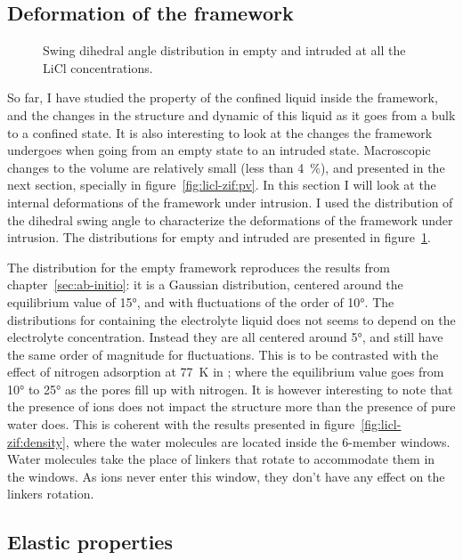 \documentclass[thesis]{subfiles}
\begin{document}
\subsection{Deformation of the framework}
\label{sec:licl-zifdeformation}

\begin{figure}[ht]
    \centering
    
    \caption{Swing dihedral angle distribution in empty and intruded  at
    all the LiCl concentrations.}
    \label{fig:licl-zif:dihedrals}
\end{figure}

So far, I have studied the property of the confined liquid inside the 
framework, and the changes in the structure and dynamic of this liquid as it
goes from a bulk to a confined state. It is also interesting to look at the
changes the framework undergoes when going from an empty state to an intruded
state. Macroscopic changes to the volume are relatively small (less than 4~\%),
and presented in the next section, specially in figure~\ref{fig:licl-zif:pv}. In
this section I will look at the internal deformations of the framework under
intrusion. I used the distribution of the  dihedral swing angle
to characterize the deformations of the framework under intrusion. The
distributions for empty and intruded  are presented in
figure~\ref{fig:licl-zif:dihedrals}.

The distribution for the empty framework reproduces the results from
chapter~\ref{sec:ab-initio}: it is a Gaussian distribution, centered around the
equilibrium value of 15°, and with fluctuations of the order of 10°. The
distributions for  containing the electrolyte liquid does not seems to
depend on the electrolyte concentration. Instead they are all centered around
5°, and still have the same order of magnitude for fluctuations. This is to be
contrasted with the effect of nitrogen adsorption at \SI{77}{K} in ; where
the equilibrium value goes from 10° to 25° as the pores fill up with nitrogen.
It is however interesting to note that the presence of ions does not impact the
structure more than the presence of pure water does. This is coherent with the
results presented in figure~\ref{fig:licl-zif:density}, where the water
molecules are located inside the 6-member windows. Water molecules take the
place of linkers that rotate to accommodate them in the windows. As ions never
enter this window, they don't have any effect on the linkers rotation.

\subsection{Elastic properties}
\end{document}
